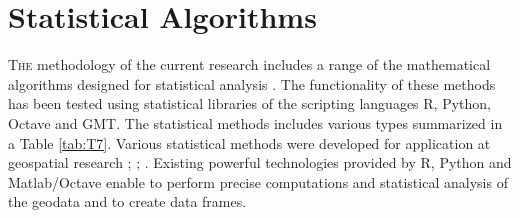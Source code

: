 \documentclass[11pt,a4paper]{report}
\begin{document}
{%
\pagebreak
\section{Statistical Algorithms}
\lettrine[lines=3]{\color{SaddleBrown}T}{he} methodology of the current research includes a range of the mathematical algorithms designed for statistical analysis \cite{RCoreTeam2014}. The functionality of these methods has been tested using statistical libraries of the scripting languages R, Python, Octave and \ac{GMT}. The statistical methods includes various types summarized in a Table \ref{tab:T7}. Various statistical methods were developed for application at geospatial research \cite{Warneretal2008}; \cite{Oliphant2007}; \cite{Robertsetal2010}. Existing powerful technologies provided by R, Python and Matlab/Octave enable to perform precise computations and statistical analysis of the geodata and to create data frames.

}
\end{document}
